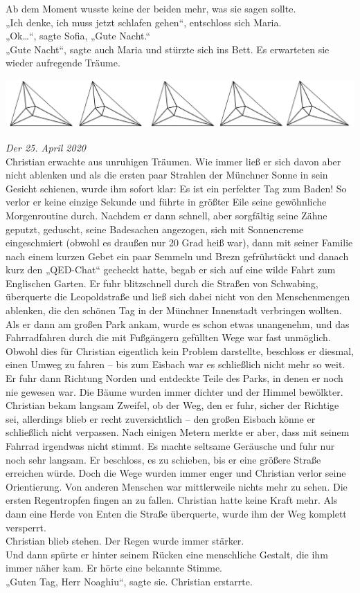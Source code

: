 \documentclass[oneside]{memoir}
\newcommand{\parasep}{
\bigskip
\bigskip
\begin{center} 
   \includegraphics[scale=.08]{parasep5.jpg} 
\end{center}
\bigskip
\bigskip
}
\begin{document}
Ab dem Moment wusste keine der beiden mehr, was sie sagen sollte.  \\ 
„Ich denke, ich muss jetzt schlafen gehen“, entschloss sich Maria. \\
„Ok\ldots“, sagte Sofia, „Gute Nacht.“ \\ 
„Gute Nacht“, sagte auch Maria und stürzte sich ins Bett. 
Es erwarteten sie wieder aufregende Träume.
     
     \parasep
     
\textit{Der 25. April 2020} \\
Christian erwachte aus unruhigen Träumen. Wie immer ließ er sich davon aber nicht ablenken und als die ersten paar Strahlen der Münchner Sonne in sein Gesicht schienen, wurde ihm sofort klar: Es ist ein perfekter Tag zum Baden!
So verlor er keine einzige Sekunde und führte in größter Eile seine gewöhnliche Morgenroutine durch.
Nachdem er dann schnell, aber sorgfältig seine Zähne geputzt, geduscht, seine Badesachen angezogen, sich mit Sonnencreme eingeschmiert (obwohl es draußen nur 20 Grad heiß war), dann mit seiner Familie nach einem kurzen Gebet ein paar Semmeln und Brezn gefrühstückt und danach kurz den „QED-Chat“ gecheckt hatte, begab er sich auf eine wilde Fahrt zum Englischen Garten.
Er fuhr blitzschnell durch die Straßen von Schwabing, überquerte die Leopoldstraße und ließ sich dabei nicht von den Menschenmengen ablenken, die den schönen Tag in der Münchner Innenstadt verbringen wollten. Als er dann am großen Park ankam, wurde es schon etwas unangenehm, und das Fahrradfahren durch die mit Fußgängern gefüllten Wege war fast unmöglich. Obwohl dies für Christian eigentlich kein Problem darstellte, beschloss er diesmal, einen Umweg zu fahren -- bis zum Eisbach war es schließlich nicht mehr so weit.
Er fuhr dann Richtung Norden und entdeckte Teile des Parks, in denen er noch nie gewesen war. Die Bäume wurden immer dichter und der Himmel bewölkter. Christian bekam langsam Zweifel, ob der Weg, den er fuhr, sicher der Richtige sei, allerdings blieb er recht zuversichtlich -- den großen Eisbach könne er schließlich nicht verpassen.
Nach einigen Metern merkte er aber, dass mit seinem Fahrrad irgendwas nicht stimmt. Es machte seltsame Geräusche und fuhr nur noch sehr langsam. Er beschloss, es zu schieben, bis er eine größere Straße erreichen würde. Doch die Wege wurden immer enger und Christian verlor seine Orientierung. Von anderen Menschen war mittlerweile nichts mehr zu sehen. Die ersten Regentropfen fingen an zu fallen.
Christian hatte keine Kraft mehr. Als dann eine Herde von Enten die Straße überquerte, wurde ihm der Weg komplett versperrt.  \\
Christian blieb stehen.
Der Regen wurde immer stärker. \\
Und dann spürte er hinter seinem Rücken eine menschliche Gestalt, die ihm immer näher kam.
Er hörte eine bekannte Stimme. \\
„Guten Tag, Herr Noaghiu“, sagte sie.
Christian erstarrte.
 
\end{document}

